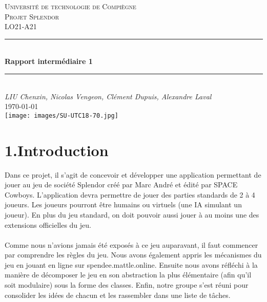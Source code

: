 \documentclass[a4paper]{article}
\begin{document}
\begin{titlepage}

\newcommand{\HRule}{\rule{\linewidth}{0.5mm}} 							%
\center 
 
\textsc{\LARGE Université de technologie de Compiègne}\\[1cm]

\textsc{\Large Projet Splendor}\\[0.2cm]
\textsc{\large LO21-A21}\\[1cm] 										%
\HRule \\[0.8cm]
{ \huge \bfseries Rapport intermédiaire 1}\\[0.7cm]								%
\HRule \\[2cm]
\large
\emph{LIU Chenxin, Nicolas Vengeon, Clément Dupuis, Alexandre Laval}\\
{\large \today}\\[13cm]
\texttt{[image: images/SU-UTC18-70.jpg]}\\[1cm] 	%
\vfill 
\end{titlepage}


\section*{1.Introduction}

Dans ce projet, il s’agit de concevoir et développer une application permettant de jouer au jeu de 
société Splendor créé par Marc André et édité par SPACE Cowboys. 
L’application devra permettre de jouer des parties standards de 2 à 4 joueurs. Les joueurs pourront être
humains ou virtuels (une IA simulant un joueur). En plus du jeu standard, on doit pouvoir aussi jouer
à au moins une des extensions officielles du jeu.\\
\\
Comme nous n'avions jamais été exposés à ce jeu auparavant, il faut commencer par comprendre les règles du jeu. 
Nous avons également appris les mécanismes du jeu en jouant en ligne sur spendee.mattle.online.
Ensuite nous avons réfléchi à la manière de décomposer le jeu en son abstraction la plus élémentaire 
(afin qu'il soit modulaire) sous la forme des classes. 
Enfin, notre groupe s'est réuni pour consolider les idées de chacun et les rassembler dans une liste de tâches.
\end{document}
